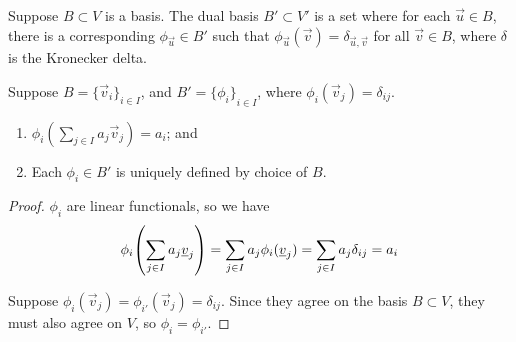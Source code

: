 \begin{definition}
    Suppose \(B \subset V\) is a basis.
    The dual basis \(B' \subset V'\) is a set where for each \(\vec{u} \in B\),
    there is a corresponding \(\phi_{\vec{u}} \in B'\)
    such that \(\phi_{\vec{u}}(\vec{v}) = \delta_{\vec{u},\vec{v}}\)
    for all \(\vec{v} \in B\),
    where \(\delta\) is the Kronecker delta.
\end{definition}
\begin{lemma}
    Suppose \(B = {\{\vec{v}_i\}}_{i \in I}\),
    and \(B' = {\{\phi_i\}}_{i \in I}\),
    where \(\phi_i(\vec{v}_j) = \delta_{ij}\).
    \begin{enumerate}[label={(\alph*)}, itemsep=0mm]
        \item \(\phi_i(\sum_{j \in I} a_j \vec{v}_j) = a_i\); and
        \item Each \(\phi_i \in B'\) is uniquely defined by choice of \(B\).
    \end{enumerate}
\end{lemma}
\begin{proof}
    \(\phi_i\) are linear functionals, so we have
    \begin{equation*}
        \phi_i\pqty{\sum_{j \in I} a_j \vec{v}_j}
        = \sum_{j \in I} a_j \phi_i(\vec{v}_j)
        = \sum_{j \in I} a_j \delta_{ij}
        = a_i
    \end{equation*}

    Suppose \(\phi_i(\vec{v}_j) = \phi_{i'}(\vec{v}_j) = \delta_{ij}\).
    Since they agree on the basis \(B \subset V\),
    they must also agree on \(V\),
    so \(\phi_i = \phi_{i'}\).
\end{proof}


